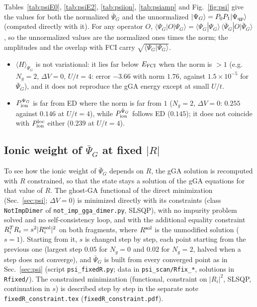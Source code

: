 \documentclass[11pt]{article}
\newcommand{\Ng}{N_{g}}
\newcommand{\dV}{\Delta V}
\begin{document}
Tables~\ref{tab:psiE0}, \ref{tab:psiE2}, \ref{tab:psiion}, \ref{tab:psiamp} and Fig.~\ref{fig:psi} give the values for both the normalized $\bar\Psi_G$ and the unnormalized $|\Psi_G\rangle=P_0P_1|\Psi_{\rm qp}\rangle$ (computed directly with it). For any operator $O$, $\langle\Psi_G|O|\Psi_G\rangle=\langle\Psi_G|\Psi_G\rangle\,\langle\bar\Psi_G|O|\bar\Psi_G\rangle$, so the unnormalized values are the normalized ones times the norm; the amplitudes and the overlap with FCI carry $\sqrt{\langle\Psi_G|\Psi_G\rangle}$.
\begin{itemize}[nosep]
  \item $\langle H\rangle_{\Psi_G}$ is not variational: it lies far below $E_{\rm FCI}$ when the norm is $>1$ (e.g.\ $\Ng=2$, $\dV=0$, $U/t=4$: error $-3.66$ with norm $1.76$, against $1.5\times10^{-5}$ for $\bar\Psi_G$), and it does not reproduce the gGA energy except at small $U/t$.
  \item $P_{\rm ion}^{\Psi_G}$ is far from ED where the norm is far from $1$ ($\Ng=2$, $\dV=0$: $0.255$ against $0.146$ at $U/t=4$), while $P_{\rm ion}^{\bar\Psi_G}$ follows ED ($0.145$); it does not coincide with $P_{\rm ion}^{\rm loc}$ either ($0.239$ at $U/t=4$).
\end{itemize}

\subsection{Ionic weight of $\bar\Psi_G$ at fixed $|R|$}
\label{sec:Rfix}
To see how the ionic weight of $\bar\Psi_G$ depends on $R$, the gGA solution is recomputed with $R$ constrained, so that the state stays a solution of the gGA equations for that value of $R$. The ghost-GA functional of the direct minimization (Sec.~\ref{sec:psi}; $\dV=0$) is minimized directly with its constraints (class \texttt{NotImpDimer} of \texttt{not\_imp\_gga\_dimer.py}, SLSQP), with no impurity problem solved and no self-consistency loop, and with the additional equality constraint $R_i^{T}R_i=s^2|R_i^{\rm sol}|^2$ on both fragments, where $R^{\rm sol}$ is the unmodified solution ($s=1$). Starting from it, $s$ is changed step by step, each point starting from the previous one (largest step $0.05$ for $\Ng=0$ and $0.02$ for $\Ng=2$, halved when a step does not converge), and $\bar\Psi_G$ is built from every converged point as in Sec.~\ref{sec:psi} (script \texttt{psi\_fixedR.py}; data in \texttt{psi\_scan/Rfix\_*}, solutions in \texttt{Rfixed/}). The constrained minimization (functional, constraint on $|R_i|^2$, SLSQP, continuation in $s$) is described step by step in the separate note \texttt{fixedR\_constraint.tex} (\texttt{fixedR\_constraint.pdf}).
\end{document}
